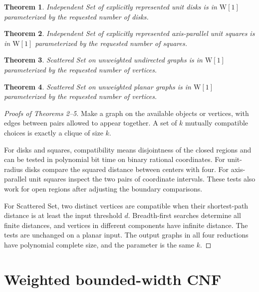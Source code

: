 \documentclass[11pt]{article}
\newtheorem{theorem}{Theorem}
\begin{document}
\hypertarget{unit-disk-independent-set-w1-membership}{}
\begin{theorem}
Independent Set of explicitly represented unit disks is in
\(\mathrm{W}[1]\) parameterized by the requested number of disks.
\end{theorem}

\hypertarget{unit-square-independent-set-w1-membership}{}
\begin{theorem}
Independent Set of explicitly represented axis-parallel unit squares
is in \(\mathrm{W}[1]\) parameterized by the requested number of squares.
\end{theorem}

\hypertarget{scattered-set-w1-membership}{}
\begin{theorem}
Scattered Set on unweighted undirected graphs is in \(\mathrm{W}[1]\)
parameterized by the requested number of vertices.
\end{theorem}

\hypertarget{planar-scattered-set-w1-membership}{}
\begin{theorem}
Scattered Set on unweighted planar graphs is in \(\mathrm{W}[1]\)
parameterized by the requested number of vertices.
\end{theorem}

\begin{proof}[Proofs of Theorems 2--5]
Make a graph on the available objects or vertices, with edges
between pairs allowed to appear together. A set of \(k\) mutually
compatible choices is exactly a clique of size \(k\).

For disks and squares, compatibility means disjointness of the closed
regions and can be tested in polynomial bit time on binary rational
coordinates. For unit-radius disks compare the squared distance
between centers with four. For axis-parallel unit squares inspect
the two pairs of coordinate intervals. These tests also work for
open regions after adjusting the boundary comparisons.

For Scattered Set, two distinct vertices are compatible when their
shortest-path distance is at least the input threshold \(d\).
Breadth-first searches determine all finite distances, and vertices in
different components have infinite distance. The tests are unchanged
on a planar input. The output graphs in all four reductions have
polynomial complete size, and the parameter is the same \(k\).
\end{proof}

\section{Weighted bounded-width CNF}
\end{document}
